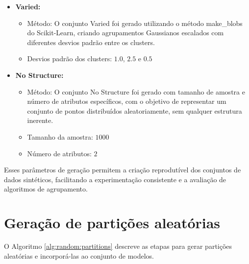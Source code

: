 \begin{itemize}
\begin{itemize}
        \item \textit{Random state}: $8$
    \end{itemize}
    \item \textbf{Varied:}
    \begin{itemize}
        \item Método: O conjunto Varied foi gerado utilizando o método \textsf{make\_blobs} do Scikit-Learn, criando agrupamentos Gaussianos escalados com diferentes desvios padrão entre os clusters.
        \item Desvios padrão dos clusters: $1.0$, $2.5$ e $0.5$
    \end{itemize}
    \item \textbf{No Structure:}
    \begin{itemize}
        \item Método: O conjunto No Structure foi gerado com tamanho de amostra e número de atributos específicos, com o objetivo de representar um conjunto de pontos distribuídos aleatoriamente, sem qualquer estrutura inerente.
        \item Tamanho da amostra: $1000$
        \item Número de atributos: $2$
    \end{itemize}
\end{itemize}

Esses parâmetros de geração permitem a criação reprodutível dos conjuntos de dados sintéticos, facilitando a experimentação consistente e a avaliação de algoritmos de agrupamento.

\section{Geração de partições aleatórias}

O Algoritmo \ref{alg:random:partitions} descreve as etapas para gerar partições aleatórias e incorporá-las ao conjunto de modelos.

